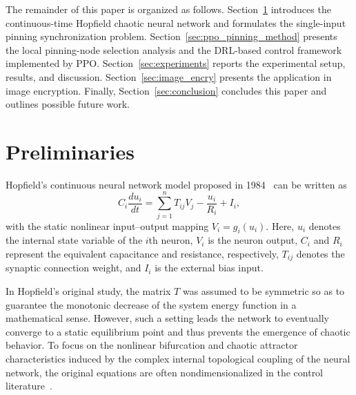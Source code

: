 \documentclass[a4paper,fleqn]{cas-sc}
\theoremstyle{plain}
\theoremstyle{definition}
\begin{document}
The remainder of this paper is organized as follows. Section~\ref{sec:preliminaries} introduces the continuous-time Hopfield chaotic neural network and formulates the single-input pinning synchronization problem. Section~\ref{sec:ppo_pinning_method} presents the local pinning-node selection analysis and the DRL-based control framework implemented by PPO. Section~\ref{sec:experiments} reports the experimental setup, results, and discussion. Section~\ref{sec:image_encry} presents the application in image encryption. Finally, Section~\ref{sec:conclusion} concludes this paper and outlines possible future work.

\section{Preliminaries}
\label{sec:preliminaries}
Hopfield's continuous neural network model proposed in 1984~\cite{hopfield1984neurons} can be written as
\begin{equation}
	C_i \frac{du_i}{dt} = \sum_{j=1}^{n} T_{ij} V_j - \frac{u_i}{R_i} + I_i,
	\label{eq:hopfield_original_1}
\end{equation}
with the static nonlinear input--output mapping $V_i = g_i(u_i)$. Here, $u_i$ denotes the internal state variable of the $i$th neuron, $V_i$ is the neuron output, $C_i$ and $R_i$ represent the equivalent capacitance and resistance, respectively, $T_{ij}$ denotes the synaptic connection weight, and $I_i$ is the external bias input.

In Hopfield's original study, the matrix $T$ was assumed to be symmetric so as to guarantee the monotonic decrease of the system energy function in a mathematical sense. However, such a setting leads the network to eventually converge to a static equilibrium point and thus prevents the emergence of chaotic behavior. To focus on the nonlinear bifurcation and chaotic attractor characteristics induced by the complex internal topological coupling of the neural network, the original equations are often nondimensionalized in the control literature~\cite{LI2013a, mahmoud2021analysis}.
\end{document}
